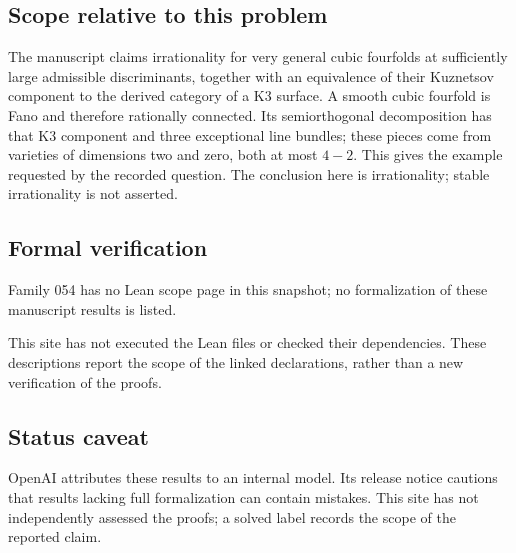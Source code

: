 \documentclass[11pt]{article}
\begin{document}
\subsection{Scope relative to this problem}
The manuscript claims irrationality for very general cubic fourfolds at sufficiently large admissible discriminants, together with an equivalence of their Kuznetsov component to the derived category of a K3 surface. A smooth cubic fourfold is Fano and therefore rationally connected. Its semiorthogonal decomposition has that K3 component and three exceptional line bundles; these pieces come from varieties of dimensions two and zero, both at most $4-2$. This gives the example requested by the recorded question. The conclusion here is irrationality; stable irrationality is not asserted.

\subsection{Formal verification}
Family 054 has no Lean scope page in this snapshot; no formalization of these manuscript results is listed.

This site has not executed the Lean files or checked their dependencies. These descriptions report the scope of the linked declarations, rather than a new verification of the proofs.

\subsection{Status caveat}
OpenAI attributes these results to an internal model. Its release notice cautions that results lacking full formalization can contain mistakes. This site has not independently assessed the proofs; a solved label records the scope of the reported claim.
\end{document}
